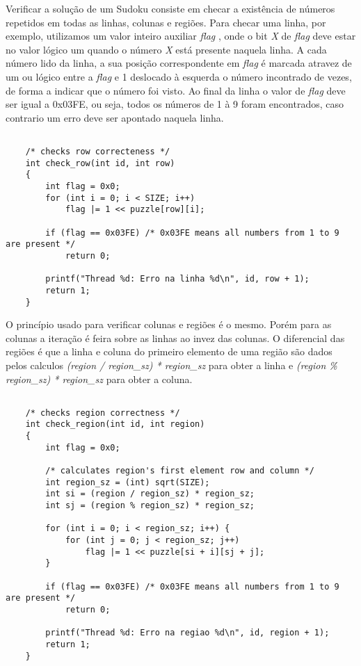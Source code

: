 \documentclass[a4paper, 12pt]{article}
\begin{document}
Verificar a solução de um Sudoku consiste em checar a existência de números
repetidos em todas as linhas, colunas e regiões. Para checar uma linha,
por exemplo, utilizamos um valor inteiro auxiliar \textit{flag} , onde o bit
\textit{X} de \textit{flag} deve estar no valor lógico um quando o número \textit{X}
está presente naquela linha.
A cada número lido da linha, a sua posição correspondente em \textit{flag} é
marcada atravez de um ou lógico entre a \textit{flag} e 1 deslocado à esquerda
o número incontrado de vezes, de forma a indicar que o número foi visto.
Ao final da linha o valor de \textit{flag} deve ser igual a 0x03FE, ou seja,
 todos os números de 1 à 9 foram encontrados, caso contrario um erro deve ser
apontado naquela linha.

\begin{verbatim}

    /* checks row correcteness */
    int check_row(int id, int row)
    {
        int flag = 0x0;
        for (int i = 0; i < SIZE; i++)
            flag |= 1 << puzzle[row][i];

        if (flag == 0x03FE) /* 0x03FE means all numbers from 1 to 9 are present */
            return 0;

        printf("Thread %d: Erro na linha %d\n", id, row + 1);
        return 1;
    }

\end{verbatim}


O princípio usado para verificar colunas e regiões é o mesmo. Porém para as
colunas a iteração é feira sobre as linhas ao invez das colunas. O diferencial
das regiões é que a linha e coluna do primeiro elemento de uma região são dados
pelos calculos \textit{(region / region\_sz) * region\_sz} para obter a linha e
\textit{(region \% region\_sz) * region\_sz} para obter a coluna.

\begin{verbatim}

    /* checks region correctness */
    int check_region(int id, int region)
    {
        int flag = 0x0;

        /* calculates region's first element row and column */
        int region_sz = (int) sqrt(SIZE);
        int si = (region / region_sz) * region_sz;
        int sj = (region % region_sz) * region_sz;

        for (int i = 0; i < region_sz; i++) {
            for (int j = 0; j < region_sz; j++)
                flag |= 1 << puzzle[si + i][sj + j];
        }

        if (flag == 0x03FE) /* 0x03FE means all numbers from 1 to 9 are present */
            return 0;

        printf("Thread %d: Erro na regiao %d\n", id, region + 1);
        return 1;
    }

\end{verbatim}
\end{document}
